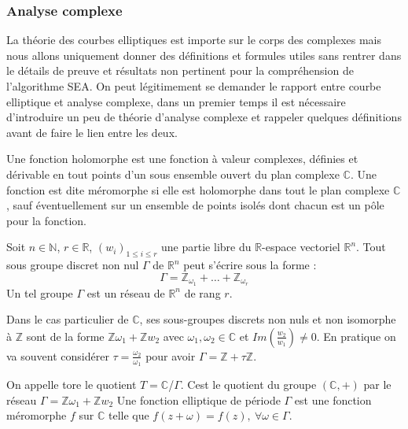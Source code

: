 \documentclass{article}
\begin{document}
\subsubsection{Analyse complexe}
La théorie des courbes elliptiques est importe sur le corps des complexes mais nous allons uniquement donner des définitions et formules utiles sans rentrer dans le détails de preuve et résultats non pertinent pour la compréhension de l'algorithme SEA. On peut légitimement se demander le rapport entre courbe elliptique et analyse complexe, dans un premier temps il est nécessaire d'introduire un peu de théorie d'analyse complexe et rappeler quelques définitions avant de faire le lien entre les deux.

\begin{defi}
Une fonction holomorphe est une fonction à valeur complexes, définies et dérivable en tout points d'un sous ensemble ouvert du plan complexe $\mathbb{C}$. Une fonction est dite méromorphe si elle est holomorphe dans tout le plan complexe $\mathbb{C}$, sauf éventuellement sur un ensemble de points isolés dont chacun est un pôle pour la fonction.
\end{defi}


\begin{prop}
Soit $n \in \mathbb{N}$, $r \in \mathbb{R}$, $(w_i)_{1 \leq i \leq r}$ une partie libre du $\mathbb{R}$-espace vectoriel $\mathbb{R}^n$. Tout sous groupe discret non nul $\Gamma$ de $\mathbb{R}^n$ peut s'écrire sous la forme :
\begin{equation*}
\Gamma = \mathbb{Z}_{\omega_1} + \ldots + \mathbb{Z}_{\omega_r}
\end{equation*}
Un tel groupe $\Gamma$ est un réseau de $\mathbb{R}^n$ de rang $r$.
\end{prop}
Dans le cas particulier de $\mathbb{C}$, ses sous-groupes discrets non nuls et non isomorphe à $\mathbb{Z}$ sont de la forme $\mathbb{Z}\omega_1 + \mathbb{Z}w_2$ avec $\omega_1, \omega_2 \in \mathbb{C}$ et $Im(\frac{w_2}{w_1}) \ne 0$. En pratique on va souvent considérer $\tau = \frac{\omega_2}{\omega_1}$ pour avoir $\Gamma = \mathbb{Z} + \tau \mathbb{Z}$.

\begin{defi}
On appelle tore le quotient $T = \mathbb{C}$/$\Gamma$. Cest le quotient du groupe $(\mathbb{C}, +)$ par le réseau $\Gamma = \mathbb{Z}\omega_1 + \mathbb{Z}w_2$
\newline
Une fonction elliptique de période $\Gamma$ est une fonction méromorphe $f$ sur $\mathbb{C}$ telle que $f(z + \omega) = f(z) ,\ \forall \omega \in \Gamma$.
\end{defi}
\end{document}
